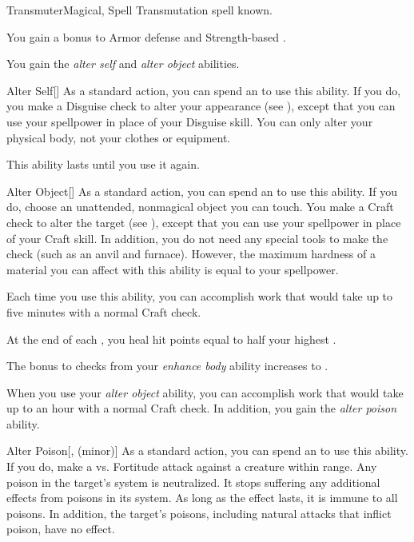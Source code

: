     \begin{feat}{Transmuter}{Magical, Spell}
        \featpre Transmutation spell known.

         You gain a  bonus to Armor defense and Strength-based .

         You gain the \textit{alter self} and \textit{alter object} abilities.
        \begin{ability}{Alter Self}[]
            As a standard action, you can spend an  to use this ability.
            If you do, you make a Disguise check to alter your appearance (see ), except that you can use your spellpower in place of your Disguise skill.
            You can only alter your physical body, not your clothes or equipment.

            This ability lasts until you use it again.
        \end{ability}

        \begin{ability}{Alter Object}[]
            As a standard action, you can spend an  to use this ability.
            If you do, choose an unattended, nonmagical object you can touch.
            You make a Craft check to alter the target (see ), except that you can use your spellpower in place of your Craft skill.
            In addition, you do not need any special tools to make the check (such as an anvil and furnace).
            However, the maximum hardness of a material you can affect with this ability is equal to your spellpower.

            Each time you use this ability, you can accomplish work that would take up to five minutes with a normal Craft check.
        \end{ability}

         At the end of each , you heal hit points equal to half your highest .

         The bonus to checks from your \textit{enhance body} ability increases to .

         When you use your \textit{alter object} ability, you can accomplish work that would take up to an hour with a normal Craft check.
        In addition, you gain the \textit{alter poison} ability.
        \begin{ability}{Alter Poison}[,  (minor)]
            As a standard action, you can spend an  to use this ability.
            If you do, make a  vs. Fortitude attack against a creature within \rngclose range.
            \hit Any poison in the target's system is neutralized.
            It stops suffering any additional effects from poisons in its system.
            As long as the effect lasts, it is immune to all poisons.
            In addition, the target's  poisons, including natural attacks that inflict poison, have no effect.
        \end{ability}


\end{feat}
